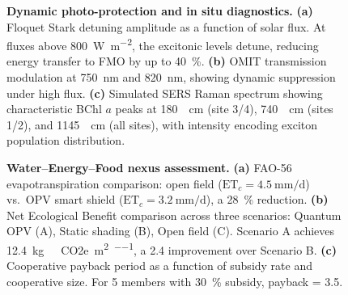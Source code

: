 \documentclass[twocolumn]{article}
\begin{document}
\begin{figure}[htbp]
\centering
{}
\caption{\textbf{Dynamic photo-protection and in situ diagnostics.}
\textbf{(a)} Floquet Stark detuning amplitude as a function of solar flux. At fluxes above \SI{800}{\W\per\m\squared}, the excitonic levels detune, reducing energy transfer to FMO by up to \SI{40}{\percent}.
\textbf{(b)} OMIT transmission modulation at \SI{750}{\nm} and \SI{820}{\nm}, showing dynamic suppression under high flux.
\textbf{(c)} Simulated SERS Raman spectrum showing characteristic BChl $a$ peaks at \SI{180}{\per\cm} (site 3/4), \SI{740}{\per\cm} (sites 1/2), and \SI{1145}{\per\cm} (all sites), with intensity encoding exciton population distribution.}
\label{fig:npq_switch}
\end{figure}

\begin{figure}[htbp]
\centering
{}
\caption{\textbf{Water--Energy--Food nexus assessment.}
\textbf{(a)} FAO-56 evapotranspiration comparison: open field ($\mathrm{ET}_c = \SI{4.5}{\mm\per\day}$) vs.\ OPV smart shield ($\mathrm{ET}_c = \SI{3.2}{\mm\per\day}$), a \SI{28}{\percent} reduction.
\textbf{(b)} Net Ecological Benefit comparison across three scenarios: Quantum OPV (A), Static shading (B), Open field (C). Scenario A achieves \SI{12.4}{\kg\ CO2e\per\m\squared\per\yr}, a \SI{2.4}{\times} improvement over Scenario B.
\textbf{(c)} Cooperative payback period as a function of subsidy rate and cooperative size. For 5 members with \SI{30}{\percent} subsidy, payback = \SI{3.5}{\yr}.}
\label{fig:lca_comparison}
\end{figure}

\end{document}
